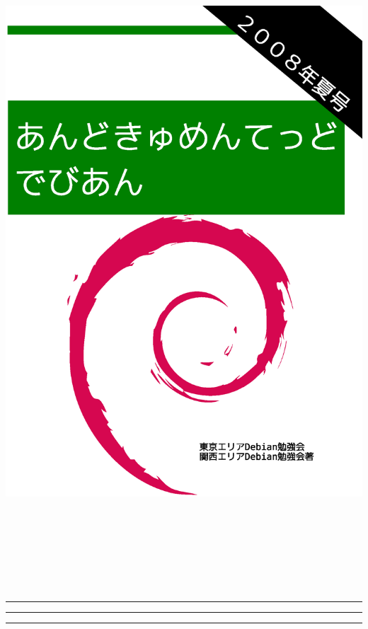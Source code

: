 \documentclass[mingoth,a4paper]{jsarticle}
\begin{document}
\begin{titlepage}
\includegraphics[height=252mm]{image2008-natsu/2008-summer.eps}
\end{titlepage}

\newpage
\begin{minipage}[]{0.2\hsize}
 \colorbox{dancerlightblue}{}
\end{minipage}
\begin{minipage}[]{0.8\hsize}
\hrule
\vspace{1mm}
\hrule
\setcounter{tocdepth}{1}
{\small
 \tableofcontents}
\vspace{1mm}
\hrule
\vspace{3cm}

\end{minipage}
\end{document}
